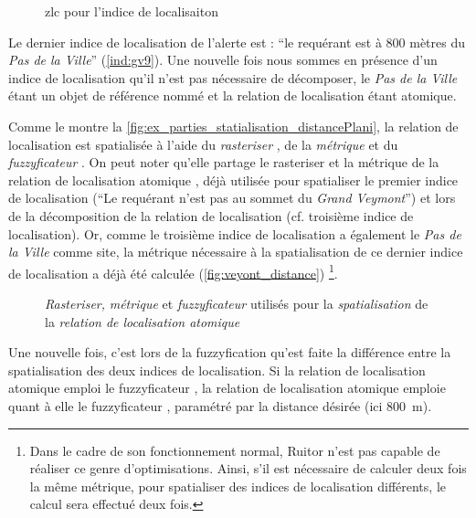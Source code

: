 \begin{figure}
  \centering
  
  \caption{\ac{zlc} pour l'indice de localisaiton }
  \label{fig:ZLC_GrandVeymont_X}
\end{figure}

Le dernier indice de localisation de l'alerte est : \enquote{le
  requérant est à 800 mètres du \emph{Pas de la Ville}}
(\ref{ind:gv9}). Une nouvelle fois nous sommes en présence d'un indice
de localisation qu'il n'est pas nécessaire de décomposer, le \emph{Pas
  de la Ville} étant un objet de référence nommé et la relation de
localisation  étant
atomique.

Comme le montre la
\autoref{fig:ex_parties_statialisation_distancePlani}, la relation de
localisation  est
spatialisée à l'aide du \emph{rasteriser} , de
la \emph{métrique}  et du
\emph{fuzzyficateur} . On peut noter qu'elle
partage le rasteriser et la métrique de la relation de localisation
atomique , déjà utilisée pour
spatialiser le premier indice de localisation (\enquote{Le requérant
  n'est pas au sommet du \emph{Grand Veymont}}) et lors de la
décomposition de la relation de localisation
 (cf. troisième indice de
localisation). Or, comme le troisième indice de localisation a
également le \emph{Pas de la Ville} comme site, la métrique nécessaire
à la spatialisation de ce dernier indice de localisation a déjà été
calculée (\autoref{fig:veyont_distance}) \footnote{Dans le cadre de
  son fonctionnement normal, Ruitor n'est pas capable de réaliser ce
  genre d'optimisations. Ainsi, s'il est nécessaire de calculer deux
  fois la même métrique, pour spatialiser des indices de localisation
  différents, le calcul sera effectué deux fois.}.

\begin{figure}
  \centering
  
  \caption{\emph{Rasteriser,} \emph{métrique} et \emph{fuzzyficateur}
    utilisés pour la \emph{spatialisation} de la \emph{relation de
      localisation atomique}
    \protect{}}
  \label{fig:ex_parties_statialisation_distancePlani}
\end{figure}

Une nouvelle fois, c'est lors de la fuzzyfication qu'est faite la
différence entre la spatialisation des deux indices de
localisation. Si la relation de localisation atomique
 emploi le fuzzyficateur
, la relation de localisation atomique
 emploie quant à
elle le fuzzyficateur , paramétré par la distance
désirée (ici \SI{800}{\meter}).

